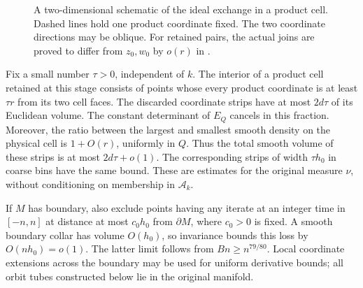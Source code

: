 \begin{figure}[htbp]
\centering
{}
\caption{A two-dimensional schematic of the ideal exchange in a
product cell.  Dashed lines hold one product coordinate fixed.
The two coordinate directions may be oblique.  For retained pairs, the
actual joins are proved to differ from $z_0,w_0$ by $o(r)$ in
.}
\label{fig:ideal-cell-exchange}
\end{figure}

Fix a small number $\tau>0$, independent of $k$.  The interior of a
product cell retained at this stage consists of points whose every
product coordinate is at least $\tau r$ from its two cell faces.
The discarded coordinate strips have at most $2d\tau$ of its Euclidean
volume.  The constant determinant of $E_Q$ cancels in this fraction.
Moreover, the ratio between the largest and smallest smooth density on
the physical cell is $1+O(r)$, uniformly in $Q$.  Thus the total smooth
volume of these strips is at most $2d\tau+o(1)$.  The corresponding
strips of width $\tau h_0$ in coarse bins have the same bound.  These
are estimates for the original measure $\nu$, without conditioning on
membership in $\mathcal A_k$.

If $M$ has boundary, also exclude points having any iterate at an integer
time in $[-n,n]$ at distance at most $c_0h_0$ from $\partial M$, where
$c_0>0$ is fixed.  A smooth boundary collar has volume $O(h_0)$, so
invariance bounds this loss by $O(nh_0)=o(1)$.  The latter limit follows
from $Bn\ge n^{79/80}$.  Local coordinate extensions across the boundary
may be used for uniform derivative bounds; all orbit tubes constructed
below lie in the original manifold.

